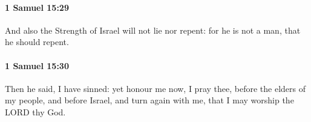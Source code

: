 		\paragraph{1 Samuel 15:29} %
			\label{1SAMUEL-15-29}

			And also the Strength of Israel will not lie nor repent: for he is not a man, that he should repent.


		\paragraph{1 Samuel 15:30} %
			\label{1SAMUEL-15-30}

			Then he said, I have sinned: yet honour me now, I pray thee, before the elders of my people, and before Israel, and turn again with me, that I may worship the LORD thy God.


